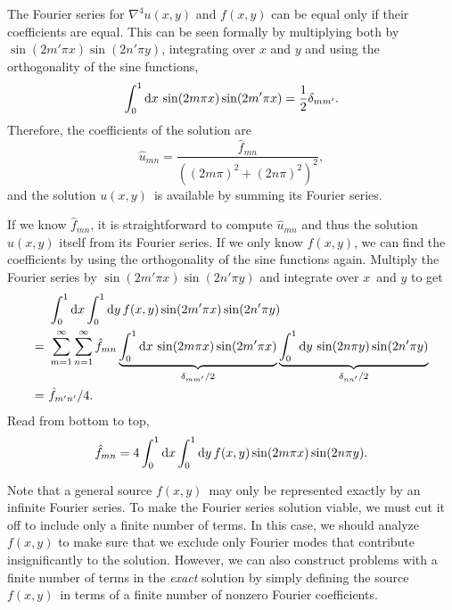 The Fourier series for $\nabla^4 u(x,y)$ and $f(x,y)$ can be equal only if their coefficients are equal.
This can be seen formally by multiplying both by $\sin(2m'\pi x) \sin(2n'\pi y)$, integrating over $x$ and $y$ and using the orthogonality of the sine functions,
\begin{equation*}
	\integral{\sin(2m\pi x) \sin(2m' \pi x)}{x}{0}{1} = \frac{1}{2} \delta_{mm'}.
\end{equation*}
Therefore, the coefficients of the solution are
\begin{equation}
	\hat{u}_{mn} = \frac{\hat{f}_{mn}}{((2m\pi)^2+(2n\pi)^2)^2},
\end{equation}
and the solution $u(x,y)$ is available by summing its Fourier series.

If we know $\hat{f}_{mn}$, it is straightforward to compute $\hat{u}_{mn}$ and thus the solution $u(x,y)$ itself from its Fourier series.
If we only know $f(x,y)$, we can find the coefficients by using the orthogonality of the sine functions again.
Multiply the Fourier series by $\sin(2 m' \pi x) \sin(2 n' \pi y)$ and integrate over $x$ and $y$ to get
\begin{equation*}
\begin{split}
  & \,\, \integraltwo{f(x,y) \sin(2 m' \pi x) \sin(2 n' \pi y)}{x}{y}{0}{1}{0}{1} \\
= & \,\, \sum_{m=1}^{\infty} \sum_{n=1}^{\infty} \hat{f}_{mn} \underbrace{\integral{\sin(2m\pi x)\sin(2m'\pi x)}{x}{0}{1}}_{\delta_{mm'}/2} \underbrace{\integral{\sin(2n\pi y)\sin(2n'\pi y)}{y}{0}{1}}_{\delta_{nn'}/2} \\
= & \,\, \hat{f}_{m'n'} / 4.
\end{split}
\end{equation*}
Read from bottom to top,
\begin{equation}
\hat{f}_{mn} = 4 \integraltwo{f(x,y) \sin(2 m \pi x) \sin(2 n \pi y)}{x}{y}{0}{1}{0}{1}.
\end{equation}

Note that a general source $f(x,y)$ may only be represented exactly by an infinite Fourier series.
To make the Fourier series solution viable, we must cut it off to include only a finite number of terms.
In this case, we should analyze $f(x,y)$ to make sure that we exclude only Fourier modes that contribute insignificantly to the solution.
However, we can also construct problems with a finite number of terms in the \emph{exact} solution by simply defining the source $f(x,y)$ in terms of a finite number of nonzero Fourier coefficients.

